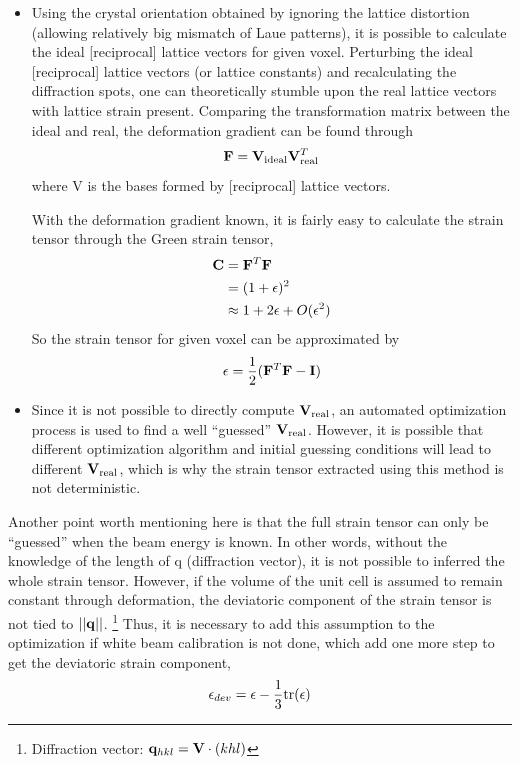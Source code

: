 \documentclass[12pt]{scrartcl}
\begin{document}
\begin{enumerate}
\begin{itemize}
	\item
	Using the crystal orientation obtained by ignoring the lattice distortion (allowing relatively big mismatch of Laue patterns), it is possible to calculate the ideal [reciprocal] lattice vectors for given voxel.
	Perturbing the ideal [reciprocal] lattice vectors (or lattice constants) and recalculating the diffraction spots, one can theoretically stumble upon the real lattice vectors with lattice strain present. 
	Comparing the transformation matrix between the ideal and real, the deformation gradient can be found through
\[
	\mathbf{F} = \mathbf{V}_\text{ideal} \mathbf{V}_\text{real}^T
\]
where \tnsr V is the bases formed by [reciprocal] lattice vectors.
	
	With the deformation gradient known, it is fairly easy to calculate the strain tensor through the Green strain tensor,
\begin{align*}
	\mathbf{C} &= \mathbf{F}^T \mathbf{F} \\
	           &= (1 + \mathbf{\epsilon})^2 \\
	           &\approx 1 + 2 \mathbf{\epsilon} + O(\mathbf{\epsilon}^2)
\end{align*}
	So the strain tensor for given voxel can be approximated by
\[
	\mathbf{\epsilon} = \dfrac{1}{2}(\mathbf{F}^T \mathbf{F} - \mathbf{I})
\]

	\item
	Since it is not possible to directly compute $\mathbf{V}_\text{real}$, an automated optimization process is used to find a well ``guessed'' $\mathbf{V}_\text{real}$.
	However, it is possible that different optimization algorithm and initial guessing conditions will lead to different $\mathbf{V}_\text{real}$, which is why the strain tensor extracted using this method is not deterministic.

	\end{itemize} 
\end{enumerate}

Another point worth mentioning here is that the full strain tensor can only be ``guessed'' when the beam energy is known.
In other words, without the knowledge of the length of \tnsr q (diffraction vector), it is not possible to inferred the whole strain tensor.
However, if the volume of the unit cell is assumed to remain constant through deformation, the deviatoric component of the strain tensor is not tied to $||\mathbf{q}||$.
\footnote{Diffraction vector: $\mathbf{q}_{hkl} = \mathbf{V} \cdot (khl) $}
Thus, it is necessary to add this assumption to the optimization if white beam calibration is not done, which add one more step to get the deviatoric strain component,
\[
	\mathbf{\epsilon}_{dev} = \mathbf{\epsilon} - \dfrac{1}{3}\text{tr}(\mathbf{\epsilon})
\]
\end{document}
